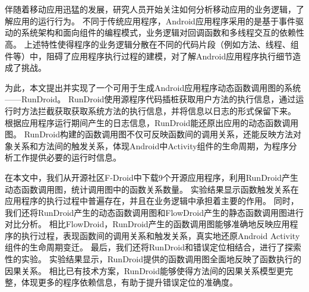 
\chapter*{}


\setlength{\baselineskip}{25pt}	



伴随着移动应用迅猛的发展，研究人员开始关注如何分析移动应用的业务逻辑，了解应用的运行行为。
不同于传统应用程序，Android应用程序采用的是基于事件驱动的系统架构和面向组件的编程模式，业务逻辑对回调函数和多线程交互的依赖性高。
上述特性使得程序的业务逻辑分散在不同的代码片段（例如方法、线程、组件等）中，阻碍了应用程序执行过程的建模，对了解Android应用程序执行细节造成了挑战。



为此，本文提出并实现了一个可用于生成Android应用程序动态函数调用图的系统——RunDroid。
RunDroid使用源程序代码插桩获取用户方法的执行信息，通过运行时方法拦截获取获取系统方法的执行信息，并将信息以日志的形式保留下来。
根据应用程序运行期间产生的日志信息，RunDroid能还原出应用的动态函数调用图。
RunDroid构建的函数调用图不仅可反映函数间的调用关系，还能反映方法对象关系和方法间的触发关系，体现Android中Activity组件的生命周期，为程序分析工作提供必要的运行时信息。




在本文中，我们从开源社区F-Droid中下载9个开源应用程序，利用RunDroid产生动态函数调用图，统计调用图中的函数关系数量。
实验结果显示函数触发关系在应用程序的执行过程中普遍存在，并且在业务逻辑中承担着主要的作用。
同时，我们还将RunDroid产生的动态函数调用图和FlowDroid产生的静态函数调用图进行对比分析。
相比FlowDroid，RunDroid产生的函数调用图能够准确地反映应用程序的执行过程，表现函数间的调用关系和触发关系，真实地还原Android Activity组件的生命周期变迁。
最后，我们还将RunDroid和错误定位相结合，进行了探索性的实验。
实验结果显示，RunDroid提供的函数调用图全面地反映了函数执行的因果关系。
相比已有技术方案，RunDroid能够使得方法间的因果关系模型更完整，体现更多的程序依赖信息，有助于提升错误定位的准确度。




 
